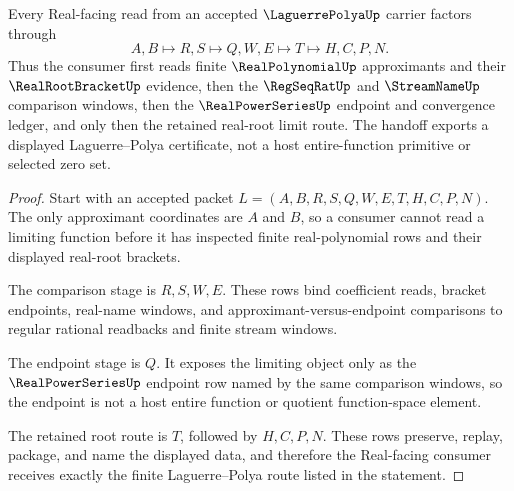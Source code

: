 \begin{theorem}
\label{thm:laguerre-polya-real-root-limit-route}
Every Real-facing read from an accepted $\LaguerrePolyaUp$ carrier factors through
$$
A,B \longmapsto R,S \longmapsto Q,W,E \longmapsto T \longmapsto H,C,P,N .
$$
Thus the consumer first reads finite $\RealPolynomialUp$ approximants and their $\RealRootBracketUp$ evidence, then the $\RegSeqRatUp$ and $\StreamNameUp$ comparison windows, then the $\RealPowerSeriesUp$ endpoint and convergence ledger, and only then the retained real-root limit route. The handoff exports a displayed Laguerre--Polya certificate, not a host entire-function primitive or selected zero set.
\end{theorem}
\begin{proof}
Start with an accepted packet $L=(A,B,R,S,Q,W,E,T,H,C,P,N)$. The only approximant coordinates are $A$ and $B$, so a consumer cannot read a limiting function before it has inspected finite real-polynomial rows and their displayed real-root brackets.

The comparison stage is $R,S,W,E$. These rows bind coefficient reads, bracket endpoints, real-name windows, and approximant-versus-endpoint comparisons to regular rational readbacks and finite stream windows.

The endpoint stage is $Q$. It exposes the limiting object only as the $\RealPowerSeriesUp$ endpoint row named by the same comparison windows, so the endpoint is not a host entire function or quotient function-space element.

The retained root route is $T$, followed by $H,C,P,N$. These rows preserve, replay, package, and name the displayed data, and therefore the Real-facing consumer receives exactly the finite Laguerre--Polya route listed in the statement.
\end{proof}



